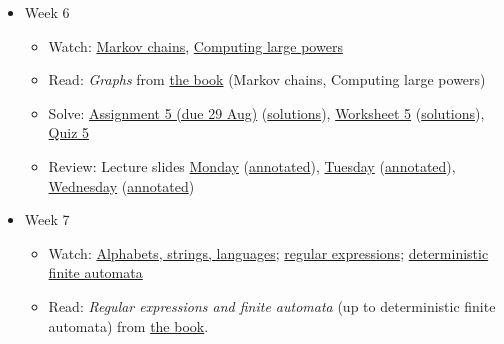 \documentclass{amsart}
\begin{document}
\begin{itemize}
\item Week 6
\begin{itemize}
\item Watch: \href{https://canvas.anu.edu.au/files/757565/}{Markov chains}, \href{https://canvas.anu.edu.au/files/757569/}{Computing large powers}
\item Read: \emph{Graphs} from \href{https://canvas.anu.edu.au/files/715877/}{the book} (Markov chains, Computing large powers)
\item Solve: \href{https://canvas.anu.edu.au/files/766550/download?download\_frd=1\&verifier=hIrzRPTCuNXvHSfwvI9Pyqb769uPvMQN6TPHyyed}{Assignment 5 (due 29 Aug)} (\href{https://canvas.anu.edu.au/files/831136/download?download\_frd=1\&verifier=3OFCtsBt88g1sijZ97fUic7wl55HLXVyKEG9KiNb}{solutions}), \href{https://canvas.anu.edu.au/files/779144/download?download\_frd=1\&verifier=3548NOHUS1N7zmv2BYsn0H8SxILPzhvTMALide17}{Worksheet 5} (\href{https://canvas.anu.edu.au/files/847725/download?download\_frd=1\&verifier=KveqL5tvm1iBWGr0a6FPmpvg0QG04NCuKhjevWqw}{solutions}), \href{https://canvas.anu.edu.au/files/847946/download?download\_frd=1\&verifier=wfv6aQrbvmhQAz4zlucmJqQqWL3xN7YycBYkmxVv}{Quiz 5}
\item Review: Lecture slides \href{https://canvas.anu.edu.au/files/778295/download?download\_frd=1\&verifier=nUjl6E1VwIPzjWArDBzpbDM23HQv7hCSxg4KiM42}{Monday} (\href{https://canvas.anu.edu.au/files/781990/download?download\_frd=1\&verifier=AOIEwlDaSAv4ZXNC3e4YOXdPXJyijwuZWzpBYbM8}{annotated}), \href{https://canvas.anu.edu.au/files/781989/download?download\_frd=1\&verifier=OhPbe8UsP9Bk9IedJLmWMPgpkOCGfafEkPQvyvZt}{Tuesday} (\href{https://canvas.anu.edu.au/files/784988/download?download\_frd=1\&verifier=DrYvbJJzG86ijjbd571ADgR2lce4WpMVjz9LZXu2}{annotated}), \href{https://canvas.anu.edu.au/files/784984/download?download\_frd=1\&verifier=L6GKxF4dW2BgCL1BF5A7I3UJFm8ivSEYjs8P4oOc}{Wednesday} (\href{https://canvas.anu.edu.au/files/791422/download?download\_frd=1\&verifier=OSqK4uZ1GXVRrVQMFL2agNF8kUUwMdjU5XOL0DQU}{annotated})
\end{itemize}
\item Week 7
\begin{itemize}
\item Watch: \href{https://canvas.anu.edu.au/files/812083/}{Alphabets, strings, languages}; \href{https://canvas.anu.edu.au/files/812084/}{regular expressions}; \href{https://canvas.anu.edu.au/files/812086/}{deterministic finite automata}
\item Read: \emph{Regular expressions and finite automata} (up to deterministic finite automata) from \href{https://canvas.anu.edu.au/files/715877/}{the book}.

\end{itemize}
\end{itemize}
\end{document}

